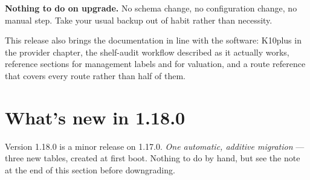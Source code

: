 \begin{note}
\textbf{Nothing to do on upgrade.} No schema change, no configuration
change, no manual step. Take your usual backup out of habit rather than
necessity.
\end{note}

This release also brings the documentation in line with the software:
K10plus in the provider chapter, the shelf-audit workflow described as
it actually works, reference sections for management labels and for
valuation, and a route reference that covers every route rather than
half of them.

\section{What's new in 1.18.0}\label{sec:whats-new-1.18.0}

Version 1.18.0 is a minor release on 1.17.0. \emph{One automatic,
additive migration} \string— three new tables, created at first boot.
Nothing to do by hand, but see the note at the end of this section
before downgrading.


